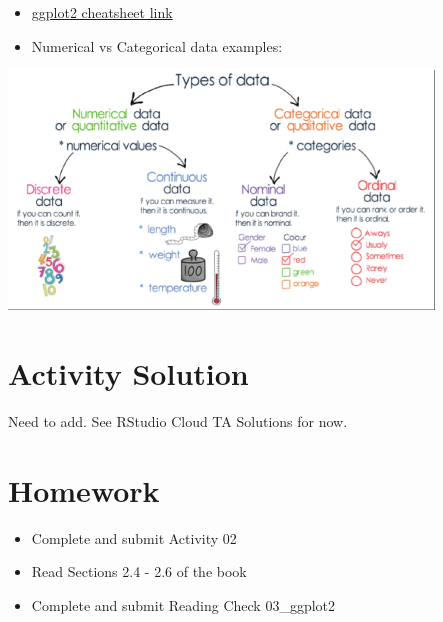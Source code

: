 \documentclass[
  letterpaper,
  DIV=11,
  numbers=noendperiod]{scrreprt}
\begin{document}
\begin{tcolorbox}[enhanced jigsaw, colframe=quarto-callout-note-color-frame, breakable, colback=white, toprule=.15mm, leftrule=.75mm, left=2mm, opacityback=0, rightrule=.15mm, arc=.35mm, bottomrule=.15mm]

\begin{itemize}
\item
  \href{https://www.rstudio.com/resources/cheatsheets/}{ggplot2
  cheatsheet link}
\item
  Numerical vs Categorical data examples:
\end{itemize}

\includegraphics[width=\textwidth,height=2.5in]{images/images_lecture/data_types.png}
\end{tcolorbox}

\hypertarget{activity-solution-1}{%
\section*{Activity Solution}\label{activity-solution-1}}

Need to add. See RStudio Cloud TA Solutions for now.

\hypertarget{homework-2}{%
\section*{Homework}\label{homework-2}}

\begin{itemize}
\item
  Complete and submit Activity 02
\item
  Read Sections 2.4 - 2.6 of the book
\item
  Complete and submit Reading Check 03\_ggplot2
\end{itemize}
\end{document}
